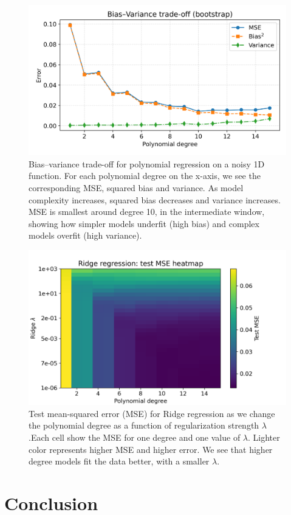 \documentclass[amssymb,twocolumn,aps]{revtex4}
\begin{document}
\begin{figure}[h]
    \centering
    \includegraphics[width=1\linewidth]{Project-1/Figures/bias_variance_tradeoff.png}
    \caption{Bias–variance trade-off for polynomial regression on a noisy 1D function. For each polynomial degree on the x-axis, we see the corresponding MSE, squared bias and variance. As model complexity increases, squared bias decreases and variance increases. MSE is smallest around degree 10, in the intermediate window, showing how simpler models underfit (high bias) and complex models overfit (high variance).}
    \label{fig:biasvariance}
\end{figure}

\begin{figure}[h]
    \centering
    \includegraphics[width=1\linewidth]{Project-1/Figures/heatmap.png}
    \caption{Test mean-squared error (MSE) for Ridge regression as we change the polynomial degree as a function of regularization strength $\lambda$.Each cell show the MSE for one degree and one value of $\lambda$. Lighter color represents higher MSE and higher error. We see that higher degree models fit the data better, with a smaller $\lambda$. }
    \label{fig:heatmap}
\end{figure}


\section{Conclusion}\label{section:conclusion} 



\end{document}
